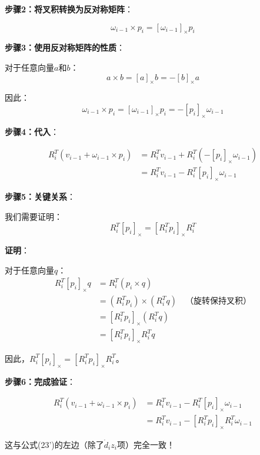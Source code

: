 \documentclass[12pt,a4paper]{article}
\begin{document}
\textbf{步骤2：将叉积转换为反对称矩阵}：

\begin{equation}
\omega_{i-1} \times p_i = [\omega_{i-1}]_{\times} p_i
\end{equation}

\textbf{步骤3：使用反对称矩阵的性质}：

对于任意向量$a$和$b$：
\begin{equation}
a \times b = [a]_{\times} b = -[b]_{\times} a
\end{equation}

因此：
\begin{equation}
\omega_{i-1} \times p_i = [\omega_{i-1}]_{\times} p_i = -[p_i]_{\times} \omega_{i-1}
\end{equation}

\textbf{步骤4：代入}：

\begin{align}
R_i^T (v_{i-1} + \omega_{i-1} \times p_i) &= R_i^T v_{i-1} + R_i^T (-[p_i]_{\times} \omega_{i-1}) \\
&= R_i^T v_{i-1} - R_i^T [p_i]_{\times} \omega_{i-1}
\end{align}

\textbf{步骤5：关键关系}：

我们需要证明：
\begin{equation}
R_i^T [p_i]_{\times} = [R_i^T p_i]_{\times} R_i^T
\end{equation}

\textbf{证明}：

对于任意向量$q$：
\begin{align}
R_i^T [p_i]_{\times} q &= R_i^T (p_i \times q) \\
&= (R_i^T p_i) \times (R_i^T q) \quad \text{（旋转保持叉积）} \\
&= [R_i^T p_i]_{\times} (R_i^T q) \\
&= [R_i^T p_i]_{\times} R_i^T q
\end{align}

因此，$R_i^T [p_i]_{\times} = [R_i^T p_i]_{\times} R_i^T$。

\textbf{步骤6：完成验证}：

\begin{align}
R_i^T (v_{i-1} + \omega_{i-1} \times p_i) &= R_i^T v_{i-1} - R_i^T [p_i]_{\times} \omega_{i-1} \\
&= R_i^T v_{i-1} - [R_i^T p_i]_{\times} R_i^T \omega_{i-1}
\end{align}

这与公式(23')的左边（除了$\dot{d}_i z_i$项）完全一致！
\end{document}
